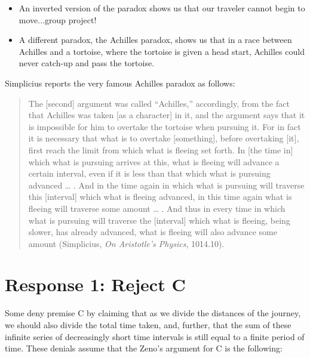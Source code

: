 \documentclass[oneside]{article}
\begin{document}
\begin{itemize}
\item
  An inverted version of the paradox shows us that our traveler cannot
  begin to move...group project!
\item
  A different paradox, the Achilles paradox, shows us that in a race
  between Achilles and a tortoise, where the tortoise is given a head
  start, Achilles could never catch-up and pass the tortoise.
\end{itemize}
Simplicius reports the very famous Achilles paradox as follows: 
\begin{quote}
The {[}second{]} argument was called ``Achilles,'' accordingly, from the
fact that Achilles was taken {[}as a character{]} in it, and the
argument says that it is impossible for him to overtake the tortoise
when pursuing it. For in fact it is necessary that what is to overtake
{[}something{]}, before overtaking {[}it{]}, first reach the limit from
which what is fleeing set forth. In {[}the time in{]} which what is
pursuing arrives at this, what is fleeing will advance a certain
interval, even if it is less than that which what is pursuing advanced
\ldots{} . And in the time again in which what is pursuing will traverse
this {[}interval{]} which what is fleeing advanced, in this time again
what is fleeing will traverse some amount \ldots{} . And thus in every
time in which what is pursuing will traverse the {[}interval{]} which
what is fleeing, being slower, has already advanced, what is fleeing
will also advance some amount (Simplicius, \emph{On Aristotle's Physics},
1014.10).
\end{quote}

\section{Response 1: Reject C}\label{response-1-reject-c}

Some deny premise C by claiming that as we divide the distances of the
journey, we should also divide the total time taken, and, further, that
the sum of these infinite series of decreasingly short time intervals is
still equal to a finite period of time. These denials assume that the
Zeno's argument for C is the following:
\end{document}
